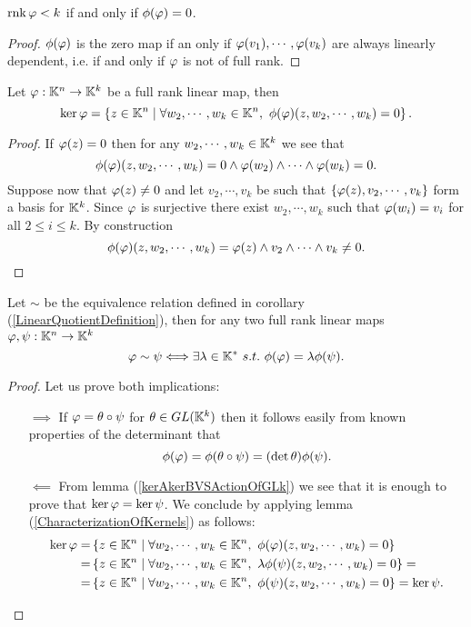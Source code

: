 \begin{remark}\label{WhenPluckerMapIsZero}
$\mathrm{rnk}\, \varphi<k$ if and only if $\phi(\varphi)=0$.
\end{remark}
\begin{proof}
$\phi(\varphi)$ is the zero map if an only if $\varphi(v_1),\cdots, \varphi(v_k)$ are always linearly dependent, i.e. if and only if $\varphi$ is not of full rank.
\end{proof}

\begin{lemma}\label{CharacterizationOfKernels}
Let $\varphi:\mathbb{K}^n\to \mathbb{K}^k$ be a full rank linear map, then
\[\ker\varphi=\left\{{z\in\mathbb{K}^n\mid \forall w_2,\cdots, w_k\in \mathbb{K}^n,\ \phi(\varphi)(z,w_2,\cdots,w_k)=0}\right\}.\]
\end{lemma}
\begin{proof}
If $\varphi(z)=0$ then for any $w_2,\cdots, w_k\in \mathbb{K}^k$ we see that 
\[\phi(\varphi)(z, w_2,\cdots, w_k)=0\wedge \varphi(w_2)\wedge\cdots\wedge \varphi(w_k)=0.\]
Suppose now that $\varphi(z)\neq 0$ and let $v_2,\cdots, v_k$ be such that $\left\{{\varphi(z), v_2,\cdots,v_k}\right\}$ form a basis for $\mathbb{K}^k$. Since $\varphi$ is surjective there exist $w_2,\cdots, w_k$ such that $\varphi(w_i)=v_i$ for all $2\leq i\leq k$.
By construction 
\[\phi(\varphi)(z,w_2,\cdots, w_k)=\varphi(z)\wedge v_2\wedge\cdots\wedge v_k\neq0.\]
\end{proof}

\begin{proposition}\label{PluckerMapInjectiveOnGrassmanniansUpToScalar}
Let $\sim$ be the equivalence relation defined in corollary (\ref{LinearQuotientDefinition}), then for any two full rank linear maps $\varphi,\psi:\mathbb{K}^n\to \mathbb{K}^k$
\[\vp\sim \psi\coimplies \exists \la\in\K^\ast\ s.t.\ \phi(\vp)=\la\phi(\psi).\]
\end{proposition}
\begin{proof}
Let us prove both implications:
\setlength{\leftmargini}{0cm}
\begin{itemize}
\item[$\boxed{\implies}$] If $\varphi=\theta\circ \psi$ for $\theta\in GL(\mathbb{K}^k)$ then it follows easily from known properties of the determinant that \[\phi(\varphi)=\phi(\theta\circ \psi)=(\det\theta) \phi(\psi).\]
\item[$\boxed{\impliedby}$] From lemma (\ref{kerAkerBVSActionOfGLk}) we see that it is enough to prove that $\ker \varphi=\ker \psi$. We conclude by applying lemma (\ref{CharacterizationOfKernels}) as follows:
\begin{align*}
\ker\vp=&\cpa{z\in\K^n\mid \forall w_2,\cdots, w_k\in \K^n,\ \phi(\vp)(z,w_2,\cdots,w_k)=0}\\
=&\cpa{z\in\K^n\mid \forall w_2,\cdots, w_k\in \K^n,\ \la\phi(\psi)(z,w_2,\cdots,w_k)=0}=\\
=&\cpa{z\in\K^n\mid \forall w_2,\cdots, w_k\in \K^n,\ \phi(\psi)(z,w_2,\cdots,w_k)=0}=\ker \psi.
\end{align*}
\end{itemize}
\setlength{\leftmargini}{0.5cm}
\end{proof}

